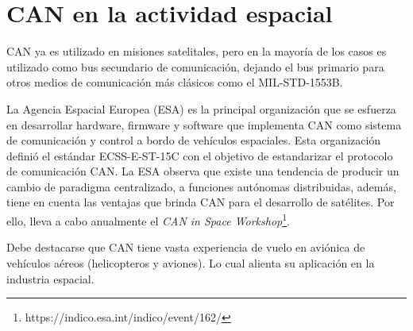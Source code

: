 \section{CAN en la actividad espacial}
CAN ya es utilizado en misiones satelitales, pero en la mayoría de los
casos es utilizado como bus secundario de comunicación, dejando el bus
primario para otros medios de comunicación más clásicos como el
MIL-STD-1553B.

La Agencia Espacial Europea (ESA) es la principal organización que se
esfuerza en desarrollar hardware, firmware y software que implementa
CAN como sistema de comunicación y control a bordo de vehículos espaciales.
Esta organización definió el estándar ECSS-E-ST-15C con el objetivo de
estandarizar el protocolo de comunicación CAN. La ESA observa que existe
una tendencia de producir un cambio de  paradigma 
centralizado, a funciones autónomas distribuidas, además, tiene en cuenta las ventajas que
brinda CAN para el desarrollo de satélites. Por ello, lleva a cabo anualmente
el \textit{CAN in Space Workshop}\footnote{https://indico.esa.int/indico/event/162/}.

Debe destacarse que CAN tiene vasta experiencia de vuelo en aviónica de
vehículos aéreos (helicopteros y aviones). Lo cual alienta su aplicación
en la industria espacial.
